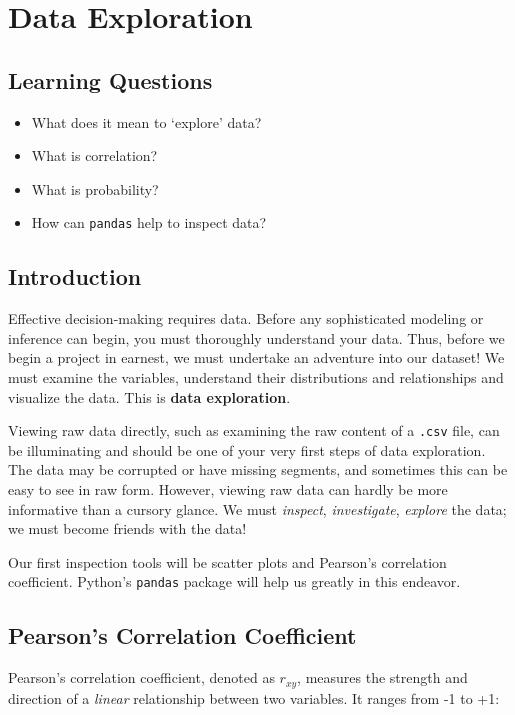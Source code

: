 \clearpage
\section{Data Exploration}\label{sec:pedagogy:stats}
\subsection*{Learning Questions}
\begin{itemize}
    \item What does it mean to `explore' data?
    \item What is correlation?
    \item What is probability?
    \item How can \verb|pandas| help to inspect data?
\end{itemize}

\subsection*{Introduction}
Effective decision-making requires data. Before any sophisticated modeling or inference can begin, you must thoroughly understand your data. Thus, before we begin a project in earnest, we must undertake an adventure into our dataset! We must examine the variables, understand their distributions and relationships and visualize the data. This is \textbf{data exploration}.

Viewing raw data directly, such as examining the raw content of a \verb|.csv| file, can be illuminating and should be one of your very first steps of data exploration. The data may be corrupted or have missing segments, and sometimes this can be easy to see in raw form. However, viewing raw data can hardly be more informative than a cursory glance. We must \textit{inspect}, \textit{investigate}, \textit{explore} the data; we must become friends with the data!

Our first inspection tools will be scatter plots and Pearson's correlation coefficient. Python's \verb|pandas| package will help us greatly in this endeavor.

\subsection*{Pearson's Correlation Coefficient}
Pearson's correlation coefficient, denoted as $r_{xy}$, measures the strength and direction of a \textit{linear} relationship between two variables. It ranges from -1 to +1:

